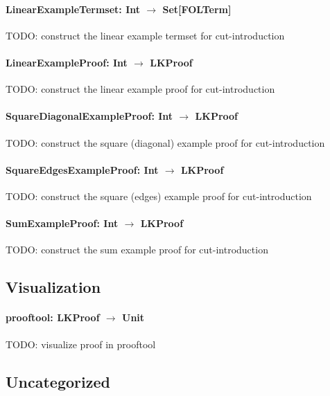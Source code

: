 \documentclass[a4paper, 11pt]{report}
\begin{document}

\paragraph{\textbf{LinearExampleTermset: Int $\rightarrow$ Set[FOLTerm]}}
{\color{red}TODO}: construct the linear example termset for cut-introduction

\paragraph{\textbf{LinearExampleProof: Int $\rightarrow$ LKProof}}
{\color{red}TODO}: construct the linear example proof for cut-introduction

\paragraph{\textbf{SquareDiagonalExampleProof: Int $\rightarrow$ LKProof}}
{\color{red}TODO}: construct the square (diagonal) example proof for cut-introduction

\paragraph{\textbf{SquareEdgesExampleProof: Int $\rightarrow$ LKProof}}
{\color{red}TODO}: construct the square (edges) example proof for cut-introduction

\paragraph{\textbf{SumExampleProof: Int $\rightarrow$ LKProof}}
{\color{red}TODO}: construct the sum example proof for cut-introduction

\subsection{Visualization}

\paragraph{\textbf{prooftool: LKProof $\rightarrow$ Unit}}
{\color{red}TODO}: visualize proof in prooftool

\subsection{Uncategorized}
\end{document}
